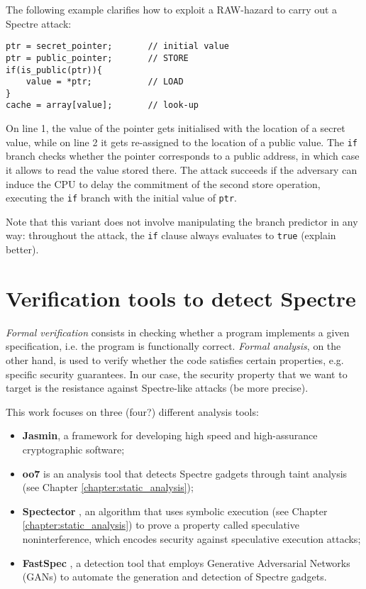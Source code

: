 \documentclass[12pt,a4paper]{book}
\theoremstyle{definition}
\begin{document}
	The following example clarifies how to exploit a RAW-hazard to carry out a Spectre attack:
	\begin{lstlisting}
ptr = secret_pointer;		// initial value
ptr = public_pointer;		// STORE
if(is_public(ptr)){	
	value = *ptr;			// LOAD
}
cache = array[value];		// look-up
	\end{lstlisting}
	On line 1, the value of the pointer gets initialised with the location of a secret value, while on line 2 it gets re-assigned to the location of a public value. The \texttt{if} branch checks whether the pointer corresponds to a public address, in which case it allows to read the value stored there. The attack succeeds if the adversary can induce the CPU to delay the commitment of the second store operation, executing the \texttt{if} branch with the initial value of \texttt{ptr}.
	
	Note that this variant does not involve manipulating the branch predictor in any way: throughout the attack, the \texttt{if} clause always evaluates to \texttt{true} (explain better).
	
	\chapter{Verification tools to detect Spectre}\label{chapter:verification}
	
	\textit{Formal verification} consists in checking whether a program implements a given specification, i.e. the program is functionally correct. \textit{Formal analysis}, on the other hand, is used to verify whether the code satisfies certain properties, e.g. specific security guarantees. In our case, the security property that we want to target is the resistance against Spectre-like attacks (be more precise). 
	
	This work focuses on three (four?) different analysis tools:
	\begin{itemize}
		\item \textbf{Jasmin}\cite{Almeida2017}, a framework for developing high speed and high-assurance cryptographic software;
		\item \textbf{oo7} \cite{Wang2019} is an analysis tool that detects Spectre gadgets through taint analysis (see Chapter \ref{chapter:static_analysis});
		\item \textbf{Spectector} \cite{Guarnieri2018}, an algorithm that uses symbolic execution (see Chapter \ref{chapter:static_analysis}) to prove a property called speculative noninterference, which encodes security against speculative execution attacks;
		\item \textbf{FastSpec} \cite{Tol2021}, a detection tool that employs Generative Adversarial Networks (GANs) to  automate the generation and detection of Spectre gadgets.
	\end{itemize}
	
\end{document}
